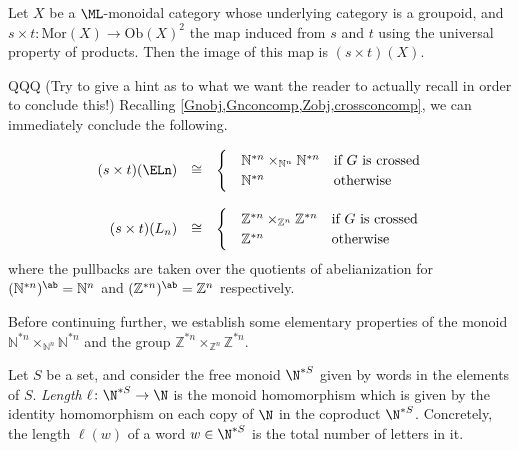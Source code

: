 \begin{lem}\label{stmon} Let $X$ be a $\ML$-monoidal category whose underlying category is a groupoid, and $s \times t \colon  \mathrm{Mor}(X) \rightarrow \mathrm{Ob}(X)^2$ the map induced from $s$ and $t$ using the universal property of products. Then the image of this map is $(s \times t)(X)$.
\end{lem} 


QQQ (Try to give a hint as to what we want the reader to actually recall in order to conclude this!) Recalling \cref{Gnobj,Gnconcomp,Zobj,crossconcomp}, we can immediately conclude the following.

\begin{cor} \label{stpullback}
  \[
    \begin{array}{rll} 
  		(s \times t)(\ELn) & \cong & \begin{cases}
  								\quad \mathbb{N}^{\ast n} \times_{\mathbb{N}^n} \mathbb{N}^{\ast n} & \text{if $G$ is crossed}\\
  								\quad \mathbb{N}^{\ast n} & \text{otherwise}
  							\end{cases} \\
  		& & \\
  		(s \times t)(L_n) & \cong & \begin{cases}
  								\quad \mathbb{Z}^{\ast n} \times_{\mathbb{Z}^n} \mathbb{Z}^{\ast n}  & \text{if $G$ is crossed}\\
  								\quad \mathbb{Z}^{\ast n} & \text{otherwise}
  							\end{cases} \\
    \end{array}
  \]
where the pullbacks are taken over the quotients of abelianization for $(\mathbb{N}^{\ast n})^{\ab} = \mathbb{N}^n$ and $(\mathbb{Z}^{\ast n})^{\ab} = \mathbb{Z}^n$ respectively.
\end{cor}

Before continuing further, we establish some elementary properties of the monoid $\mathbb{N}^{\ast n} \times_{\mathbb{N}^n} \mathbb{N}^{\ast n}$ and the group $\mathbb{Z}^{\ast n} \times_{\mathbb{Z}^n} \mathbb{Z}^{\ast n}$.

\begin{Defi}\label{length}
Let $S$ be a set, and consider the free monoid $\N^{*S}$ given by words in the elements of $S$. \emph{Length} $\ell \colon \N^{*S} \rightarrow \N$ is the monoid homomorphism which is given by the identity homomorphism on each copy of $\N$ in the coproduct $\N^{*S}$. Concretely, the length $\ell(w)$ of a word $w \in \N^{*S}$ is the total number of letters in it.
\end{Defi}

